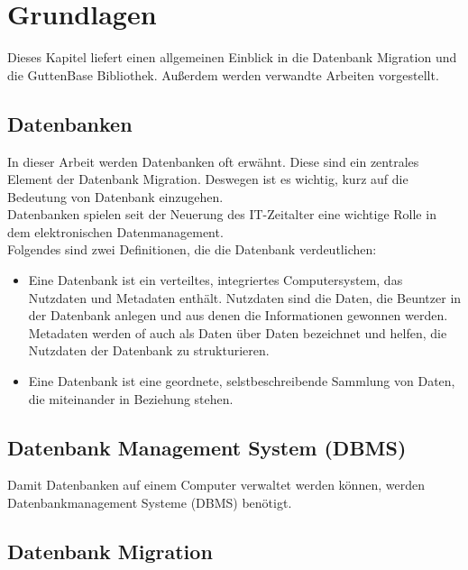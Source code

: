 \chapter{Grundlagen}
Dieses Kapitel liefert einen allgemeinen Einblick in die Datenbank Migration und die GuttenBase Bibliothek. Außerdem werden verwandte Arbeiten vorgestellt. 
\section{Datenbanken}
In dieser Arbeit werden Datenbanken oft erwähnt. Diese sind ein zentrales Element der Datenbank Migration. Deswegen ist es wichtig, kurz auf die Bedeutung von Datenbank einzugehen.\\
Datenbanken spielen seit der Neuerung des IT-Zeitalter eine wichtige Rolle in dem elektronischen Datenmanagement.\\
Folgendes sind zwei Definitionen, die die Datenbank verdeutlichen:
\begin{itemize}
	\item 
	Eine Datenbank ist ein verteiltes, integriertes Computersystem, das Nutzdaten und Metadaten enthält. Nutzdaten sind die Daten, die Beuntzer in der Datenbank anlegen und aus denen die Informationen gewonnen werden. Metadaten werden of auch als Daten über Daten bezeichnet und helfen, die Nutzdaten der Datenbank zu strukturieren.
	
	\item
	Eine Datenbank ist eine geordnete, selstbeschreibende Sammlung von Daten, die miteinander in Beziehung stehen.
\end{itemize}


\section{Datenbank Management System (DBMS)}
Damit Datenbanken auf einem Computer verwaltet werden können, werden Datenbankmanagement Systeme (DBMS) benötigt.

\section{Datenbank Migration}




